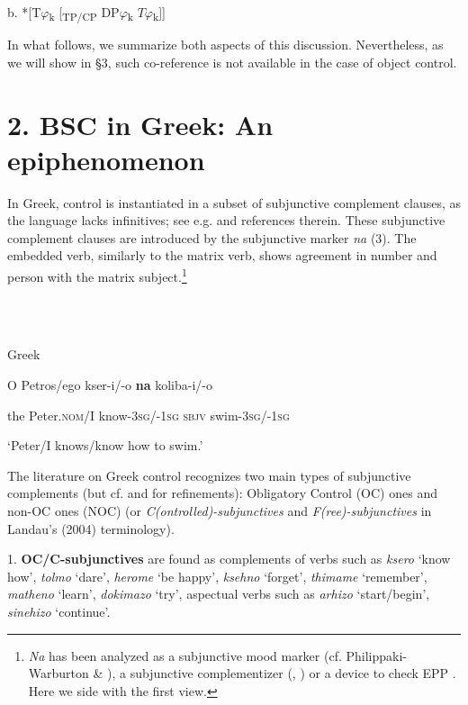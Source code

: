 \documentclass[output=paper]{langsci/langscibook}
\begin{document}
  b.  *[T$\varphi $\textsubscript{k} [\textsubscript{TP/CP} DP$\varphi $\textsubscript{k} $T\varphi $\textsubscript{k}]]

In what follows, we summarize both aspects of this discussion. Nevertheless, as we will show in §3, such co-reference is not available in the case of object control.

\section{ 2. BSC in Greek: An epiphenomenon}

In Greek, control is instantiated in a subset of subjunctive complement clauses, as the language lacks infinitives; see e.g. \citet{Varlokosta1994} and references therein. These subjunctive complement clauses are introduced by the subjunctive marker \textit{na} (3).\textstyleFootnoteSymbol{} The embedded verb, similarly to the matrix verb, shows agreement in number and person with the matrix subject.\footnote{\textit{Na} has been analyzed as a subjunctive mood marker (cf. Philippaki-Warburton \& \citealt{Veloudis1984}), a subjunctive complementizer (\citealt{Tsoulas1993}, \citealt{Aggouraki1991}) or a device to check EPP \citep{Roussou2009}. Here we side with the first view.} 

\ea%
    \label{ex:key:3}
    \gll\\
        \\
    \glt
    \z

         Greek

O  Petros/ego  kser-i/-o        \textbf{na}    koliba-i/-o

\begin{styleNurTexti}
  the    Peter.\textsc{nom}/I  know-\textsc{3sg}/-\textsc{1sg}    \textsc{sbjv}  swim-\textsc{3sg}/-\textsc{1sg}
\end{styleNurTexti}

\begin{styleNurTexti}
  ‘Peter/I knows/know how to swim.’
\end{styleNurTexti}

The literature on Greek control recognizes two main types of subjunctive complements (but cf. \citealt{Spyropoulos2007a} and \citealt{Roussou2009} for refinements): Obligatory Control (OC) ones and non-OC ones (NOC) (or \textit{C(ontrolled)-subjunctives} and \textit{F(ree)-subjunctives} in Landau's (2004) terminology).

\begin{styleNurTexti}
1. \textbf{OC/C-subjunctives} are found as complements of verbs such as \textit{ksero} ‘know how’, \textit{tolmo} ‘dare’, \textit{herome} ‘be happy’, \textit{ksehno} ‘forget’, \textit{thimame} ‘remember’, \textit{matheno} ‘learn’, \textit{dokimazo} ‘try’, aspectual verbs such as \textit{arhizo} ‘start/begin’, \textit{sinehizo} ‘continue’.
\end{styleNurTexti}
\end{document}
